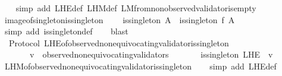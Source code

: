 \begin{isabellebody}
%
\isadelimproof
\ \ %
\endisadelimproof
%
\isatagproof
{}\isamarkupfalse%
\ {\isacharparenleft}simp\ add{\isacharcolon}\ L{\isacharunderscore}H{\isacharunderscore}E{\isacharunderscore}def\ L{\isacharunderscore}H{\isacharunderscore}M{\isacharunderscore}def\ L{\isacharunderscore}M{\isacharunderscore}from{\isacharunderscore}non{\isacharunderscore}observed{\isacharunderscore}validator{\isacharunderscore}is{\isacharunderscore}empty{\isacharparenright}%
\endisatagproof
{\isafoldproof}%
%
\isadelimproof
\isanewline
%
\endisadelimproof
\isanewline
{}\isamarkupfalse%
\ image{\isacharunderscore}of{\isacharunderscore}singleton{\isacharunderscore}is{\isacharunderscore}singleton\ {\isacharcolon}\ \isanewline
\ \ {\isachardoublequoteopen}is{\isacharunderscore}singleton\ A\ {\isasymLongrightarrow}\ is{\isacharunderscore}singleton\ {\isacharparenleft}f\ {\isacharbackquote}A{\isacharparenright}{\isachardoublequoteclose}\ \isanewline
%
\isadelimproof
\ \ %
\endisadelimproof
%
\isatagproof
{}\isamarkupfalse%
\ {\isacharparenleft}simp\ add{\isacharcolon}\ is{\isacharunderscore}singleton{\isacharunderscore}def{\isacharparenright}\isanewline
\ \ \isamarkupfalse%
\ blast%
\endisatagproof
{\isafoldproof}%
%
\isadelimproof
\isanewline
%
\endisadelimproof
\isanewline
{}\isamarkupfalse%
\ {\isacharparenleft}\ Protocol{\isacharparenright}\ L{\isacharunderscore}H{\isacharunderscore}E{\isacharunderscore}of{\isacharunderscore}observed{\isacharunderscore}non{\isacharunderscore}equivocating{\isacharunderscore}validator{\isacharunderscore}is{\isacharunderscore}singleton\ {\isacharcolon}\ \isanewline
\ \ {\isachardoublequoteopen}{\isasymforall}\ {\isasymsigma}\ {\isasymin}\ {\isasymSigma}{\isachardot}\ {\isasymforall}\ v\ {\isasymin}\ observed{\isacharunderscore}non{\isacharunderscore}equivocating{\isacharunderscore}validators\ {\isasymsigma}{\isachardot}\isanewline
\ \ \ \ \ \ is{\isacharunderscore}singleton\ {\isacharparenleft}L{\isacharunderscore}H{\isacharunderscore}E\ {\isasymsigma}\ v{\isacharparenright}{\isachardoublequoteclose}\isanewline
%
\isadelimproof
\ \ %
\endisadelimproof
%
\isatagproof
{}\isamarkupfalse%
\ L{\isacharunderscore}H{\isacharunderscore}M{\isacharunderscore}of{\isacharunderscore}observed{\isacharunderscore}non{\isacharunderscore}equivocating{\isacharunderscore}validator{\isacharunderscore}is{\isacharunderscore}singleton\isanewline
\ \ \isamarkupfalse%
\ {\isacharparenleft}simp\ add{\isacharcolon}\ L{\isacharunderscore}H{\isacharunderscore}E{\isacharunderscore}def{\isacharparenright}\isanewline

\end{isabellebody}
